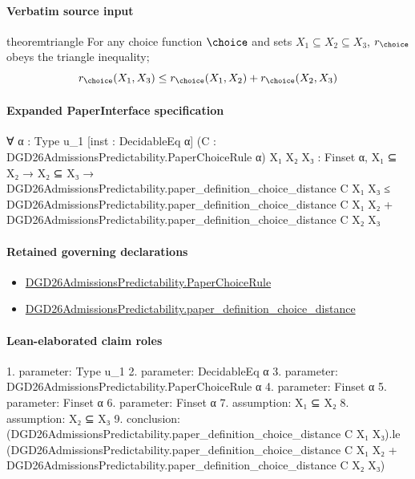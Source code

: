\documentclass[10pt]{article}
\begin{document}
\paragraph{Verbatim source input}
\begin{ReviewVerbatim}
\begin{restatable}{theorem}{triangle}
\label{thm:triangle-ineq}
For any choice function $\choice$ and sets $X_1 \subseteq X_2 \subseteq X_3$, $r_\choice$ obeys the triangle inequality;
$$r_\choice(X_1, X_3) \leq r_\choice(X_1, X_2) + r_\choice(X_2, X_3)$$
\end{restatable}
\end{ReviewVerbatim}



\paragraph{Expanded PaperInterface specification}
\begin{ReviewVerbatim}
∀ {α : Type u_1} [inst : DecidableEq α] (C : DGD26AdmissionsPredictability.PaperChoiceRule α) {X₁ X₂ X₃ : Finset α},
  X₁ ⊆ X₂ →
    X₂ ⊆ X₃ →
      DGD26AdmissionsPredictability.paper_definition_choice_distance C X₁ X₃ ≤
        DGD26AdmissionsPredictability.paper_definition_choice_distance C X₁ X₂ +
          DGD26AdmissionsPredictability.paper_definition_choice_distance C X₂ X₃
\end{ReviewVerbatim}

\paragraph{Retained governing declarations}
\begin{itemize}\raggedright
\item \hyperlink{governing-declaration-4678951b4432b184}{DGD26\allowbreak{}Admissions\allowbreak{}Predictability.\allowbreak{}Paper\allowbreak{}Choice\allowbreak{}Rule}
\item \hyperlink{governing-declaration-64f97a980e20e425}{DGD26\allowbreak{}Admissions\allowbreak{}Predictability.\allowbreak{}paper\_\allowbreak{}definition\_\allowbreak{}choice\_\allowbreak{}distance}
\end{itemize}
\paragraph{Lean-elaborated claim roles}\begin{ReviewVerbatim}
1. parameter: Type u_1
2. parameter: DecidableEq α
3. parameter: DGD26AdmissionsPredictability.PaperChoiceRule α
4. parameter: Finset α
5. parameter: Finset α
6. parameter: Finset α
7. assumption: X₁ ⊆ X₂
8. assumption: X₂ ⊆ X₃
9. conclusion: (DGD26AdmissionsPredictability.paper_definition_choice_distance C X₁ X₃).le
  (DGD26AdmissionsPredictability.paper_definition_choice_distance C X₁ X₂ +
    DGD26AdmissionsPredictability.paper_definition_choice_distance C X₂ X₃)
\end{ReviewVerbatim}
\end{document}
